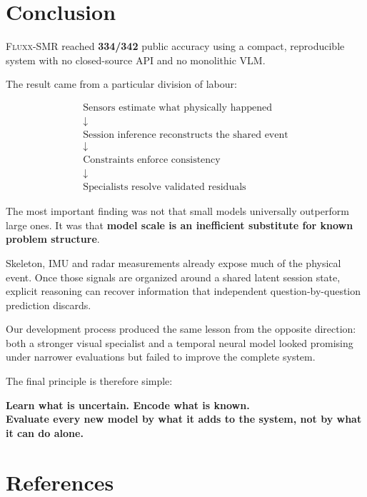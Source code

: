 \documentclass[12pt,a4paper]{article}
\newcommand{\method}{\textsc{Fluxx-SMR}}
\newcommand{\score}{\textbf{334/342}}
\begin{document}
\section{Conclusion}

\method{} reached \score{} public accuracy using a compact, reproducible system
with no closed-source API and no monolithic VLM.

The result came from a particular division of labour:

\[
\boxed{
\begin{array}{c}
\text{Sensors estimate what physically happened} \\[0.2em]
\downarrow \\[-0.1em]
\text{Session inference reconstructs the shared event} \\[0.2em]
\downarrow \\[-0.1em]
\text{Constraints enforce consistency} \\[0.2em]
\downarrow \\[-0.1em]
\text{Specialists resolve validated residuals}
\end{array}}
\]

The most important finding was not that small models universally outperform
large ones. It was that \textbf{model scale is an inefficient substitute for
known problem structure}.

Skeleton, IMU and radar measurements already expose much of the physical
event. Once those signals are organized around a shared latent session state,
explicit reasoning can recover information that independent question-by-question
prediction discards.

Our development process produced the same lesson from the opposite direction:
both a stronger visual specialist and a temporal neural model looked promising
under narrower evaluations but failed to improve the complete system.

The final principle is therefore simple:

\begin{resultbox}
\centering
\textbf{Learn what is uncertain. Encode what is known.\\
Evaluate every new model by what it adds to the system, not by what it can do alone.}
\end{resultbox}

\section{References}
\end{document}
